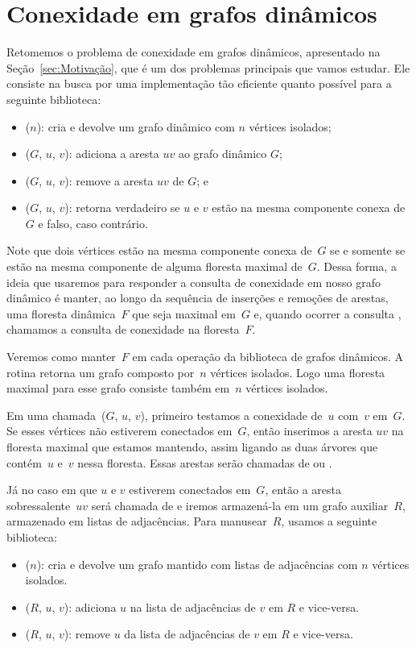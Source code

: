 \chapter{Conexidade em grafos dinâmicos}
\label{sec:connDG}
Retomemos o problema de conexidade em grafos dinâmicos, apresentado na Seção~\ref{sec:Motivação}, que é um dos problemas principais que vamos estudar. Ele consiste na busca por uma implementação tão eficiente quanto possível para a seguinte biblioteca: 
\begin{itemize}
\item \dymGraphCreate($n$): cria e devolve um grafo dinâmico com $n$ vértices isolados;
\item \dymGraphAddEdge($G$, $u$, $v$): adiciona a aresta $uv$ ao grafo dinâmico $G$;
\item \dymGraphDelEdge($G$, $u$, $v$): remove a aresta $uv$ de $G$; e
\item \dymGraphQuery($G$, $u$, $v$): retorna verdadeiro se $u$ e $v$ estão na mesma componente conexa de $G$ e falso, caso contrário.
\end{itemize}

Note que dois vértices estão na mesma componente conexa de~$G$ se e somente se estão na mesma componente de alguma floresta maximal de~$G$. Dessa forma, a ideia que usaremos para responder a consulta de conexidade em nosso grafo dinâmico é manter, ao longo da sequência de inserções e remoções de arestas, uma floresta dinâmica~$F$ que seja maximal em~$G$ e, quando ocorrer a consulta \dymGraphQuery{}, chamamos a consulta de conexidade na floresta~$F$.

Veremos como manter~$F$ em cada operação da biblioteca de grafos dinâmicos.
A rotina \dymGraphCreate{} retorna um grafo composto por~$n$ vértices isolados.
Logo uma floresta maximal para esse grafo consiste também em~$n$ vértices isolados.

Em uma chamada~\dymGraphAddEdge($G$, $u$, $v$), primeiro testamos a conexidade de~$u$ com~$v$ em~$G$. Se esses vértices não estiverem conectados em~$G$, então inserimos a aresta $uv$ na floresta maximal que estamos mantendo, assim ligando as duas árvores que contém~$u$ e~$v$ nessa floresta. Essas arestas serão chamadas de  ou .

Já no caso em que $u$ e $v$ estiverem conectados em~$G$, então a aresta sobressalente~$uv$ será chamada de  e iremos armazená-la em um grafo auxiliar~$R$, armazenado em listas de adjacências. Para manusear~$R$, usamos a seguinte biblioteca:
\begin{itemize}
    \item \graphCreate($n$): cria e devolve um grafo mantido com listas de adjacências com $n$ vértices isolados.
    \item \graphAdd($R$, $u$, $v$): adiciona $u$ na lista de adjacências de $v$ em $R$ e vice-versa.
    \item \graphDel($R$, $u$, $v$): remove $u$ da lista de adjacências de $v$ em $R$ e vice-versa.
\end{itemize}

